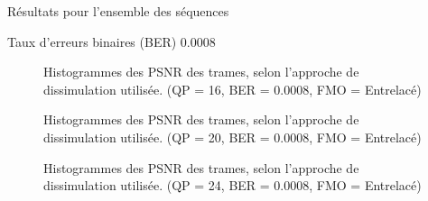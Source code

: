 \begin{section}{Résultats pour l'ensemble des séquences}
\begin{subsection}{Taux d'erreurs binaires (BER) 0.0008}
\begin{figure} 
\caption[]{Histogrammes des PSNR des trames, selon l'approche de dissimulation
utilisée. (QP = 16, BER = 0.0008, FMO = Entrelacé)}
\label{fig-HistAllDInterlaced16x8}
\end{figure}

\begin{figure} 
\caption[]{Histogrammes des PSNR des trames, selon l'approche de dissimulation
utilisée. (QP = 20, BER = 0.0008, FMO = Entrelacé)}
\label{fig-HistAllDInterlaced20x8}
\end{figure}

\begin{figure} 
\caption[]{Histogrammes des PSNR des trames, selon l'approche de dissimulation
utilisée. (QP = 24, BER = 0.0008, FMO = Entrelacé)}
\label{fig-HistAllDInterlaced24x8}
\end{figure}


\end{subsection}
\end{section}
